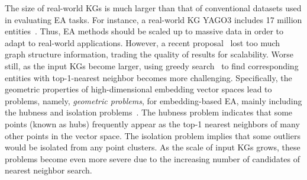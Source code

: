The size of real-world KGs is much larger than that of conventional datasets used in evaluating EA tasks.
For instance, a real-world KG YAGO3 includes 17 million entities~\cite{LargeEA22}. Thus, EA methods should be scaled up to massive data in order to adapt to real-world applications. However, a recent proposal~\cite{LargeEA22}
lost too much graph structure information, trading the quality of results for scalability.
Worse still, as the input KGs become larger, using greedy search~\cite{OpenEA2020VLDB} to find corresponding entities  with top-1-nearest neighbor becomes more challenging.
%
Specifically, the geometric properties of high-dimensional embedding vector spaces lead to problems, namely, \emph{geometric problems}, for embedding-based EA, mainly including the hubness and isolation problems~\cite{OpenEA2020VLDB}.
The hubness problem indicates that some points (known as hubs) frequently appear as the top-1 nearest neighbors of many other points in the vector space.
The isolation problem implies that some outliers would be isolated from any point clusters. As the scale of input KGs grows, these problems become even more severe due to the increasing number of candidates of nearest neighbor search.

